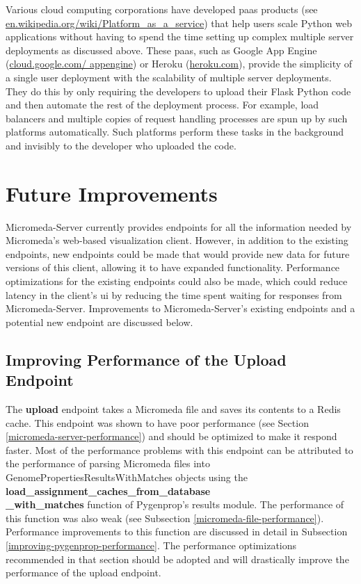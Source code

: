 Various cloud computing corporations have developed \gls{paas} 
\cite{lawton2008developing} products (see 
\href{http://en.wikipedia.org/wiki/Platform_as_a_service}{en.wikipedia.org/wiki/Platform\_as\_a\_service}) 
that help users scale Python web applications without having to spend the time 
setting up complex multiple server deployments as discussed above. These 
\gls{paas}, such as Google App Engine 
(\href{http://cloud.google.com/appengine}{cloud.google.com/ appengine}) or 
Heroku (\href{http://heroku.com}{heroku.com}), provide the simplicity of a 
single user deployment with the scalability of multiple server deployments. They 
do this by only requiring the developers to upload their Flask Python code and 
then automate the rest of the deployment process. For example, load balancers 
and multiple copies of request handling processes are spun up by such platforms 
automatically. Such platforms perform these tasks in the background and 
invisibly to the developer who uploaded the code.

\section{Future Improvements} \label{micromeda-server-improvements}

Micromeda-Server currently provides endpoints for all the information needed by 
Micromeda's web-based visualization client. However, in addition to the existing 
endpoints, new endpoints could be made that would provide new data for future 
versions of this client, allowing it to have expanded functionality. Performance 
optimizations for the existing endpoints could also be made, which could reduce 
latency in the client's \gls{ui} by reducing the time spent waiting for 
responses from Micromeda-Server. Improvements to Micromeda-Server's existing 
endpoints and a potential new endpoint are discussed below.

\subsection{Improving Performance of the Upload Endpoint}

The \textbf{upload} endpoint takes a Micromeda file and saves its contents to a 
Redis cache. This endpoint was shown to have poor performance (see Section 
\ref{micromeda-server-performance}) and should be optimized to make it respond 
faster. Most of the performance problems with this endpoint can be attributed to 
the performance of parsing Micromeda files into 
GenomePropertiesResultsWithMatches objects using the 
\textbf{load\_assignment\_caches\_from\_database \\ \_with\_matches} function of 
Pygenprop's results module. The performance of this function was also weak (see 
Subsection \ref{micromeda-file-performance}). Performance improvements to this 
function are discussed in detail in Subsection 
\ref{improving-pygenprop-performance}. The performance optimizations recommended 
in that section should be adopted and will drastically improve the performance 
of the upload endpoint.

